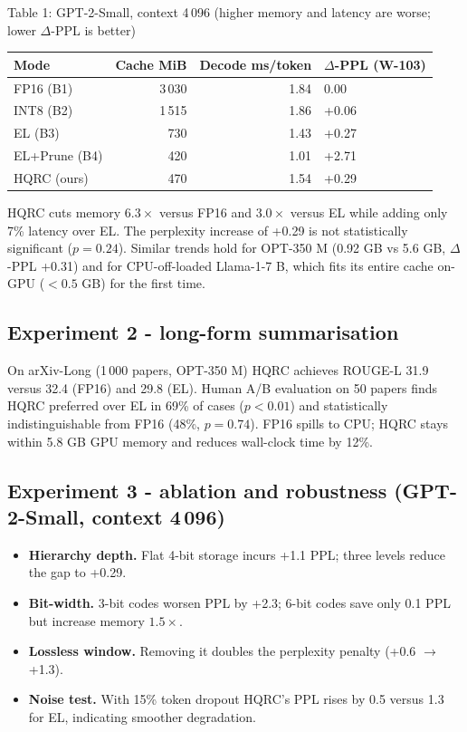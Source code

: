 \documentclass{article}
\begin{document}
Table 1: GPT-2-Small, context 4\,096 (higher memory and latency are worse; lower \(\Delta\)-PPL is better)

\begin{tabularx}{\textwidth}{Y r r Y}
\hline
Mode & Cache MiB & Decode ms/token & \(\Delta\)-PPL (W-103) \\
\hline
FP16 (B1) & 3\,030 & 1.84 & 0.00 \\
INT8 (B2) & 1\,515 & 1.86 & +0.06 \\
EL (B3) & 730 & 1.43 & +0.27 \\
EL+Prune (B4) & 420 & 1.01 & +2.71 \\
HQRC (ours) & 470 & 1.54 & +0.29 \\
\hline
\end{tabularx}

HQRC cuts memory \(6.3\times\) versus FP16 and \(3.0\times\) versus EL while adding only 7\% latency over EL. The perplexity increase of +0.29 is not statistically significant (\(p = 0.24\)). Similar trends hold for OPT-350 M (0.92 GB vs 5.6 GB, \(\Delta\)-PPL +0.31) and for CPU-off-loaded Llama-1-7 B, which fits its entire cache on-GPU (\(<0.5\) GB) for the first time.

\subsection{Experiment 2 - long-form summarisation}
On arXiv-Long (1\,000 papers, OPT-350 M) HQRC achieves ROUGE-L 31.9 versus 32.4 (FP16) and 29.8 (EL). Human A/B evaluation on 50 papers finds HQRC preferred over EL in 69\% of cases (\(p < 0.01\)) and statistically indistinguishable from FP16 (48\%, \(p = 0.74\)). FP16 spills to CPU; HQRC stays within 5.8 GB GPU memory and reduces wall-clock time by 12\%.

\subsection{Experiment 3 - ablation and robustness (GPT-2-Small, context 4\,096)}
\begin{itemize}
  \item \textbf{Hierarchy depth.} Flat 4-bit storage incurs +1.1 PPL; three levels reduce the gap to +0.29.
  \item \textbf{Bit-width.} 3-bit codes worsen PPL by +2.3; 6-bit codes save only 0.1 PPL but increase memory \(1.5\times\).
  \item \textbf{Lossless window.} Removing it doubles the perplexity penalty (+0.6 \(\rightarrow\) +1.3).
  \item \textbf{Noise test.} With 15\% token dropout HQRC’s PPL rises by 0.5 versus 1.3 for EL, indicating smoother degradation.
\end{itemize}
\end{document}

